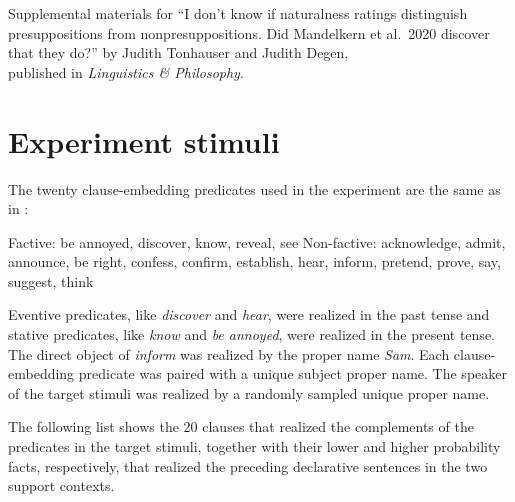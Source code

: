 \documentclass[11pt,fleqn]{article}
\newcommand{\6}{\mbox{$[\hspace*{-.6mm}[$}}
\newcommand{\9}{\mbox{$]\hspace*{-.6mm}]$}}
\begin{document}
\clearpage
{}	

\begin{center}
{\Large Supplemental materials for ``I don't know if naturalness ratings distinguish presuppositions from nonpresuppositions. Did Mandelkern et al.\ 2020 discover \\[0.05cm] that they do?''  by Judith Tonhauser and Judith Degen, \\[0.15cm] published in \emph{Linguistics \& Philosophy}.}
\end{center}

\appendix

\setcounter{page}{1}

\setcounter{table}{0}
\renewcommand{\thetable}{A\arabic{table}}

\setcounter{figure}{0}
\renewcommand{\thefigure}{A\arabic{figure}}

\section{Experiment stimuli}\label{a:clauses}

The twenty clause-embedding predicates used in the experiment are the same as in \citealt{degen-tonhauser-openmind,degen-tonhauser-language}:

\begin{exe}
\ex\label{predicates}
\begin{xlist}
\ex Factive: be annoyed, discover, know, reveal, see
\ex Non-factive: acknowledge, admit, announce, be right, confess, confirm, establish, hear, inform, pretend, prove, say, suggest, think
\end{xlist}
\end{exe}
Eventive predicates, like {\em discover} and {\em hear}, were realized in the past tense and stative predicates, like {\em know} and {\em be annoyed}, were realized in the present tense. The direct object of {\em inform} was realized by the proper name {\em Sam}. Each clause-embedding predicate was paired with a unique subject proper name. The speaker of the target stimuli was realized by a randomly sampled unique proper name. 

The following list shows the 20 clauses that realized the complements of the predicates in the target stimuli, together with their lower and higher probability facts, respectively, that realized the preceding declarative sentences in the two support contexts.
\end{document}
